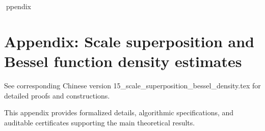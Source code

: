 ppendix

\section*{Appendix: Scale superposition and Bessel function density estimates}

See corresponding Chinese version 15_scale_superposition_bessel_density.tex for detailed proofs and constructions.

This appendix provides formalized details, algorithmic specifications, and auditable certificates supporting the main theoretical results.
